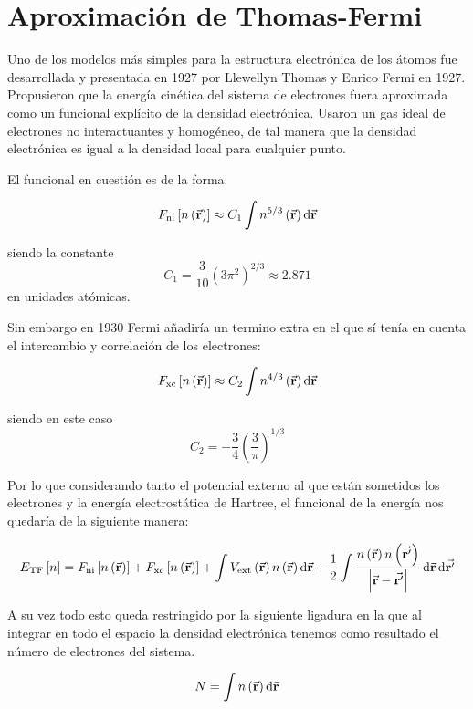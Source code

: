 \section{Aproximación de Thomas-Fermi}

Uno de los modelos más simples para la estructura electrónica de los átomos fue desarrollada y presentada en 1927 por Llewellyn Thomas y Enrico Fermi en 1927. Propusieron que la energía cinética del sistema de electrones fuera aproximada como un funcional explícito de la densidad electrónica. Usaron un gas ideal de electrones no interactuantes y homogéneo, de tal manera que la densidad electrónica es igual a la densidad local para cualquier punto.

El funcional en cuestión es de la forma:

\begin{equation}
    F_{\text{ni}} \left[ n \left( \va{r} \right) \right] \approx C_1 \int n^{5/3} \left( \va{r} \right) \dd{\va{r}}
\end{equation}

siendo la constante \begin{equation}
    C_1 = \frac{3}{10} (3 \pi^2)^{2/3} \approx 2.871
\end{equation} en unidades atómicas.

Sin embargo en 1930 Fermi añadiría un termino extra en el que sí tenía en cuenta el intercambio y correlación de los electrones:

\begin{equation}
    F_{\text{xc}}\left[ n \left( \va{r} \right) \right] \approx C_2 \int n^{4/3} \left( \va{r} \right) \dd{\va{r}}
\end{equation}

siendo en este caso \begin{equation}
    C_2 = - \frac{3}{4} \left( \frac{3}{\pi} \right)^{1/3}
\end{equation}

Por lo que considerando tanto el potencial externo al que están sometidos los electrones y la energía electrostática de Hartree, el funcional de la energía nos quedaría de la siguiente manera:

\begin{equation}
    E_{\text{TF}} \left[ n \right] = F_{\text{ni}}\left[ n \left( \va{r} \right) \right] + F_{\text{xc}}\left[ n \left( \va{r} \right) \right] + \int V_{\text{ext}} \left( \va{r} \right) n \left( \va{r} \right) \dd{\va{r}}  + \frac{1}{2} \int \frac{n \left( \va{r} \right) n \left( \va{r'} \right)}{\abs{ \va{r} - \va{r'} } } \dd{\va{r}} \dd{\va{r'}}
\end{equation}

A su vez todo esto queda restringido por la siguiente ligadura en la que al integrar en todo el espacio la densidad electrónica tenemos como resultado el número de electrones del sistema.

\begin{equation}
    N = \int n \left( \va{r} \right)  \dd{\va{r}}
\end{equation}
